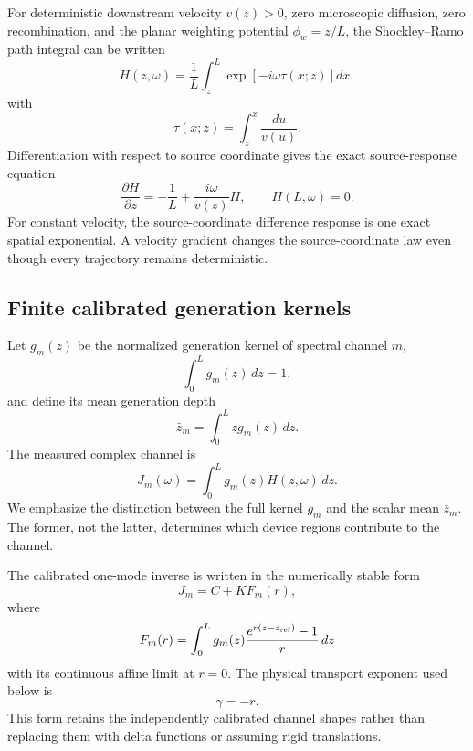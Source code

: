 \documentclass[aps,pra,twocolumn,superscriptaddress,nofootinbib]{revtex4-2}
\begin{document}
For deterministic downstream velocity $v(z)>0$, zero microscopic diffusion, zero recombination, and the planar weighting potential $\phi_w=z/L$, the Shockley--Ramo path integral can be written
\begin{equation}
H(z,\omega)
=\frac{1}{L}\int_z^L
\exp\left[-i\omega\tau(x;z)\right]dx,
\label{eq:Hpath}
\end{equation}
with
\begin{equation}
\tau(x;z)=\int_z^x\frac{du}{v(u)}.
\end{equation}
Differentiation with respect to source coordinate gives the exact source-response equation
\begin{equation}
\boxed{
\frac{\partial H}{\partial z}
=-\frac{1}{L}+\frac{i\omega}{v(z)}H,
\qquad H(L,\omega)=0.
}
\label{eq:ramoode}
\end{equation}
For constant velocity, the source-coordinate difference response is one exact spatial exponential. A velocity gradient changes the source-coordinate law even though every trajectory remains deterministic.

\subsection{Finite calibrated generation kernels}

Let $g_m(z)$ be the normalized generation kernel of spectral channel $m$,
\begin{equation}
\int_0^L g_m(z)\,dz=1,
\end{equation}
and define its mean generation depth
\begin{equation}
\bar z_m=\int_0^L z g_m(z)\,dz.
\end{equation}
The measured complex channel is
\begin{equation}
\boxed{
J_m(\omega)=\int_0^L g_m(z)H(z,\omega)\,dz.
}
\label{eq:channel}
\end{equation}
We emphasize the distinction between the full kernel $g_m$ and the scalar mean $\bar z_m$. The former, not the latter, determines which device regions contribute to the channel.

The calibrated one-mode inverse is written in the numerically stable form
\begin{equation}
J_m=C+K F_m(r),
\label{eq:onemode}
\end{equation}
where
\begin{equation}
F_m(r)=\int_0^L g_m(z)
\frac{e^{r(z-z_{\rm ref})}-1}{r}\,dz
\end{equation}
with its continuous affine limit at $r=0$. The physical transport exponent used below is
\begin{equation}
\gamma=-r.
\end{equation}
This form retains the independently calibrated channel shapes rather than replacing them with delta functions or assuming rigid translations.
\end{document}
